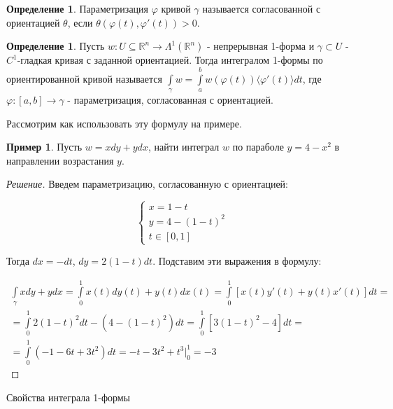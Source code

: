 \documentclass[a5paper]{article}
\newcounter{through}
\theoremstyle{plain}
\theoremstyle{definition}
\newtheorem{definition}[through]{Определение}
\newtheorem{example}[through]{Пример}
\numberwithin{through}{section}
\numberwithin{equation}{section}
\begin{document}
\begin{definition}
	Параметризация $\varphi$ кривой $\gamma$ называется согласованной с ориентацией $\theta$, если $\theta(\varphi(t), \varphi'(t))>0$.
\end{definition}

\begin{definition}
	Пусть $w : U \subseteq \mathbb{R}^n \to \Lambda^1(\mathbb{R}^n)$ - непрерывная 1-форма и $\gamma \subset U$ - $C^1$-гладкая кривая с заданной ориентацией. Тогда интегралом 1-формы по ориентированной кривой называется $\int\limits_{\gamma} w = \int\limits_{a}^{b} w(\varphi(t)) \langle \varphi'(t) \rangle dt$, где $\varphi : [a, b] \to \gamma$ - параметризация, согласованная с ориентацией.
\end{definition}

Рассмотрим как использовать эту формулу на примере.

\begin{example}
	Пусть $w = xdy + ydx$, найти интеграл $w$ по параболе $y = 4 - x^2$ в направлении возрастания $y$.
\end{example}

\begin{proof}[Решение]
	Введем параметризацию, согласованную с ориентацией:
	
	\begin{equation*}
		\begin{cases}
			x = 1 - t\\
			y = 4 - (1 - t)^2 \\
			t \in [0, 1]
		\end{cases}
	\end{equation*}
	
	Тогда $dx=-dt$, $dy=2(1-t)dt$. Подставим эти выражения в формулу:
	
	\begin{multline*}
		\int\limits_{\gamma} xdy+ydx = \int\limits_{0}^{1}x(t)dy(t)+y(t)dx(t) = \int\limits_{0}^{1} [x(t)y'(t) + y(t)x'(t)]dt  = \\ = \int\limits_{0}^{1} 2(1-t)^2dt - (4 - (1-t)^2)dt = \int\limits_{0}^{1} [3(1-t)^2 - 4]dt = \\ =  \int\limits_{0}^{1} (-1 - 6t + 3t^2)dt = -t-3t^2+t^3 \bigg|_0^1 = -3
	\end{multline*}
\end{proof}

Свойства интеграла 1-формы
\end{document}
